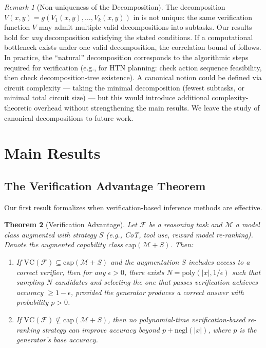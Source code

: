 \documentclass{article}
\newtheorem{theorem}{Theorem}
\theoremstyle{definition}
\theoremstyle{remark}
\newtheorem{remark}[theorem]{Remark}
\newcommand{\VC}{\mathrm{VC}}           %
\newcommand{\calM}{\mathcal{M}}         %
\newcommand{\calF}{\mathcal{F}}         %
\newcommand{\poly}{\mathrm{poly}}
\newcommand{\negl}{\mathrm{negl}}
\begin{document}
\begin{remark}[Non-uniqueness of the Decomposition]
\label{rem:decomposition}
The decomposition $V(x,y) = g(V_1(x,y), \ldots, V_k(x,y))$ in  is not unique: the same verification function $V$ may admit multiple valid decompositions into subtasks.
Our results hold for \emph{any} decomposition satisfying the stated conditions.
If a computational bottleneck exists under one valid decomposition, the correlation bound of  follows.
In practice, the ``natural'' decomposition corresponds to the algorithmic steps required for verification (e.g., for HTN planning: check action sequence feasibility, then check decomposition-tree existence).
A canonical notion could be defined via circuit complexity --- taking the minimal decomposition (fewest subtasks, or minimal total circuit size) --- but this would introduce additional complexity-theoretic overhead without strengthening the main results.
We leave the study of canonical decompositions to future work.
\end{remark}

\section{Main Results}
\label{sec:theorems}

\subsection{The Verification Advantage Theorem}

Our first result formalizes when verification-based inference methods are effective.

\begin{theorem}[Verification Advantage]
\label{thm:advantage}
Let $\calF$ be a reasoning task and $\calM$ a model class augmented with strategy $S$ (e.g., CoT, tool use, reward model re-ranking).
Denote the augmented capability class $\mathrm{cap}(\calM + S)$.
Then:
\begin{enumerate}[label=(\alph*)]
    \item If $\VC(\calF) \subseteq \mathrm{cap}(\calM + S)$ and the augmentation $S$ includes access to a correct verifier, then for any $\epsilon > 0$, there exists $N = \poly(|x|, 1/\epsilon)$ such that sampling $N$ candidates and selecting the one that passes verification achieves accuracy $\geq 1 - \epsilon$, provided the generator produces a correct answer with probability $p > 0$.
    \item If $\VC(\calF) \not\subseteq \mathrm{cap}(\calM + S)$, then no polynomial-time verification-based re-ranking strategy can improve accuracy beyond $p + \negl(|x|)$, where $p$ is the generator's base accuracy.
\end{enumerate}
\end{theorem}
\end{document}
